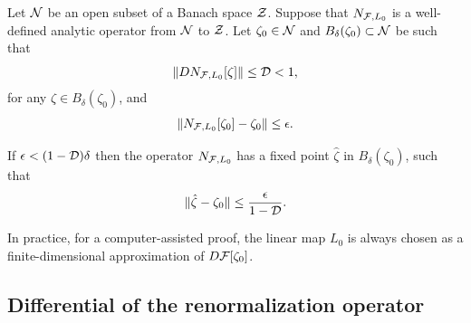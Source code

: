 \begin{cmp}
Let $\mathcal{N}$ be an open subset of a Banach space $\mathcal{Z}$.
Suppose that  $N_{\mathcal{F},L_0}$ is a well-defined  analytic operator from  $\mathcal{N}$ to $\mathcal{Z}$. Let $\zeta_0\in \mathcal{N}$ and $B_\delta(\zeta_0) \subset \mathcal{N}$ be such that
$$\| D N_{\mathcal{F},L_0}[\zeta]\| \le  \mathcal{D} <1, $$
for any $\zeta \in  B_\delta(\zeta_0)$, and
$$\|N_{\mathcal{F},L_0}[\zeta_0]-\zeta_0\|\le \epsilon.$$

If $\epsilon < (1-\mathcal{D}) \delta$ then the operator $N_{\mathcal{F},L_0}$ has a fixed point $\hat\zeta$ in $B_\delta(\zeta_0)$, such that
$$\| \hat\zeta-\zeta_0\| \le {\epsilon \over 1-\mathcal{D}}.$$
\end{cmp}

In practice, for a computer-assisted proof, the linear map $L_0$ is always chosen as a finite-dimensional approximation of $D \mathcal{F}[\zeta_0]$.

\subsection{Differential of the renormalization operator}

